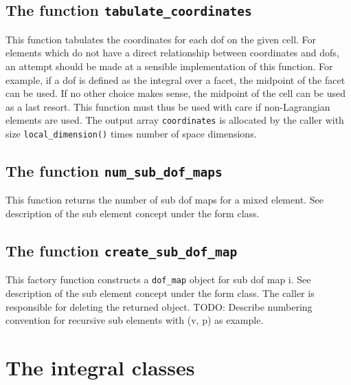 
\subsection{The function \texttt{tabulate\_coordinates}}
This function tabulates the coordinates for each dof on the given cell.
For elements which do not have a direct relationship between coordinates and dofs,
an attempt should be made at a sensible implementation of this function.
For example, if a dof is defined as the integral over a facet, the midpoint
of the facet can be used. If no other choice makes sense, the midpoint of the cell
can be used as a last resort. This function must thus be used with care if
non-Lagrangian elements are used.
The output array \texttt{coordinates} is allocated by the caller with size \texttt{local\_dimension()} times number of space dimensions.


\subsection{The function \texttt{num\_sub\_dof\_maps}}
This function returns the number of sub dof maps for a mixed element.
See description of the sub element concept under the form class.


\subsection{The function \texttt{create\_sub\_dof\_map}}
This factory function constructs a \texttt{dof\_map} object for sub dof map i.
See description of the sub element concept under the form class.
The caller is responsible for deleting the returned object.
TODO: Describe numbering convention for recursive sub elements with (v, p) as example.




\section{The integral classes}

